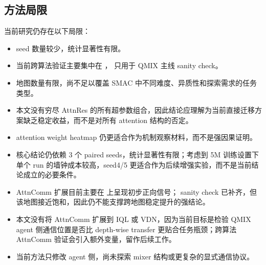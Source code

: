 \subsection{方法局限}

当前研究仍存在以下局限：

\begin{itemize}
  \item seed 数量较少，统计显著性有限。
  \item 当前跨算法验证主要集中在 ， 只用于 QMIX 主线 sanity check。
  \item 地图数量有限，尚不足以覆盖 SMAC 中不同难度、异质性和探索需求的任务类型。
  \item 本文没有穷尽 AttnRes 的所有超参数组合，因此结论应理解为当前直接迁移方案缺乏稳定收益，而不是对所有 attention 结构的否定。
  \item attention weight heatmap 仍更适合作为机制观察材料，而不是强因果证明。
  \item 核心结论仍依赖 3 个 paired seeds，统计显著性有限；考虑到 5M 训练设置下单个 run 的墙钟成本较高，seed4/5 更适合作为后续增强实验，而不是当前结论成立的必要条件。
  \item AttnComm 扩展目前主要在  上呈现初步正向信号； sanity check 已补齐，但该地图接近饱和，因此仍不能支撑跨地图稳定提升的强结论。
  \item 本文没有将 AttnComm 扩展到 IQL 或 VDN，因为当前目标是检验 QMIX agent 侧通信位置是否比 depth-wise transfer 更贴合任务瓶颈；跨算法 AttnComm 验证会引入额外变量，留作后续工作。
  \item 当前方法只修改 agent 侧，尚未探索 mixer 结构或更复杂的显式通信协议。
\end{itemize}
